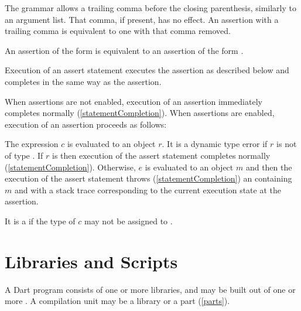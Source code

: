 \documentclass[makeidx]{article}
\begin{document}
{\LMHash{}%
The grammar allows a trailing comma before the closing parenthesis,
similarly to an argument list.
That comma, if present, has no effect.
An assertion with a trailing comma is equivalent to one with that comma removed.

\LMHash{}%
An assertion of the form  is equivalent to
an assertion of the form .

\LMHash{}%
Execution of an assert statement executes the assertion as described below
and completes in the same way as the assertion.

\LMHash{}%
When assertions are not enabled,
execution of an assertion immediately completes normally
(\ref{statementCompletion}).
When assertions are enabled,
execution of an assertion  proceeds as follows:

\LMHash{}%
The expression $c$ is evaluated to an object $r$.
It is a dynamic type error if $r$ is not of type .
If $r$ is \TRUE{} then execution of the assert statement completes normally
(\ref{statementCompletion}).
Otherwise, $e$ is evaluated to an object $m$
and then the execution of the assert statement throws
(\ref{statementCompletion})
an  containing $m$ and with
a stack trace corresponding to the current execution state at the assertion.

\LMHash{}%
It is a  if the type of $c$
may not be assigned to .



\section{Libraries and Scripts}

\LMHash{}%
A Dart program consists of one or more libraries,
and may be built out of one or more .
A compilation unit may be a library or a part (\ref{parts}).

}
\end{document}
